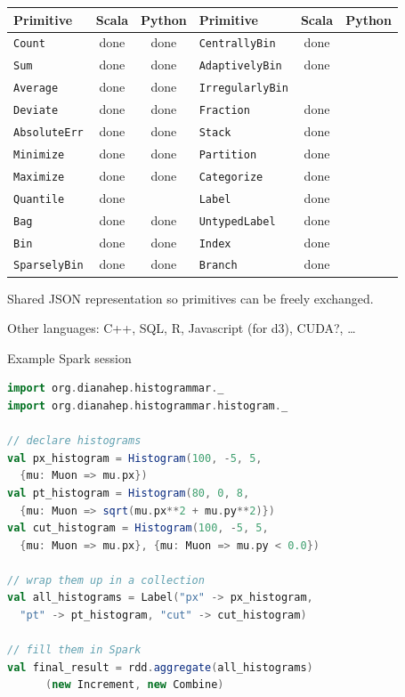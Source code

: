 \documentclass{beamer}
\begin{document}
\begin{frame}{}
\vfill
\hspace{-0.5 cm}\begin{minipage}{\linewidth}
\renewcommand{\arraystretch}{1.2}
\begin{tabular}{l c c | l c c}
Primitive & Scala & Python & Primitive & Scala & Python \\\hline
{\tt \small Count}       & done & done & {\tt \small CentrallyBin}    & done & \\
{\tt \small Sum}         & done & done & {\tt \small AdaptivelyBin}   & done & \\
{\tt \small Average}     & done & done & {\tt \small IrregularlyBin}  &      & \\    
{\tt \small Deviate}     & done & done & {\tt \small Fraction}        & done & \\
{\tt \small AbsoluteErr} & done & done & {\tt \small Stack}           & done & \\
{\tt \small Minimize}    & done & done & {\tt \small Partition}       & done & \\
{\tt \small Maximize}    & done & done & {\tt \small Categorize}      & done & \\
{\tt \small Quantile}    & done &      & {\tt \small Label}           & done & \\
{\tt \small Bag}         & done & done & {\tt \small UntypedLabel}    & done & \\
{\tt \small Bin}         & done & done & {\tt \small Index}           & done & \\
{\tt \small SparselyBin} & done & done & {\tt \small Branch}          & done & \\
\end{tabular}
\end{minipage}

\vfill
Shared JSON representation so primitives can be freely exchanged.

\vfill
Other languages: C++, SQL, R, Javascript (for d3), CUDA?, \ldots
\end{frame}

\begin{frame}[fragile]{Example Spark session}
\begin{lstlisting}[language=scala]
import org.dianahep.histogrammar._
import org.dianahep.histogrammar.histogram._

// declare histograms
val px_histogram = Histogram(100, -5, 5,
  {mu: Muon => mu.px})
val pt_histogram = Histogram(80, 0, 8,
  {mu: Muon => sqrt(mu.px**2 + mu.py**2)})
val cut_histogram = Histogram(100, -5, 5,
  {mu: Muon => mu.px}, {mu: Muon => mu.py < 0.0})

// wrap them up in a collection
val all_histograms = Label("px" -> px_histogram,
  "pt" -> pt_histogram, "cut" -> cut_histogram)

// fill them in Spark
val final_result = rdd.aggregate(all_histograms)
      (new Increment, new Combine)
\end{lstlisting}
\end{frame}
\end{document}
